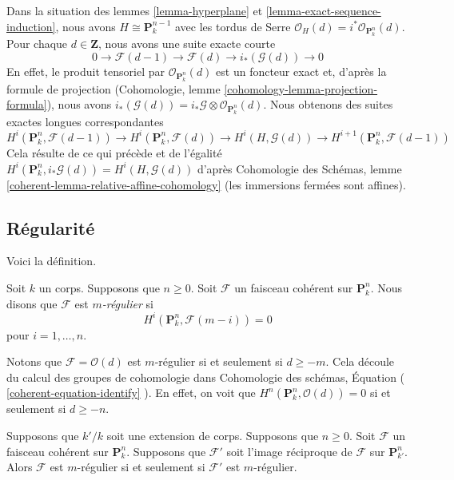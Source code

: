 \begin{remark}
\label{remark-exact-sequence-induction-cohomology}
Dans la situation des lemmes \ref{lemma-hyperplane} et
\ref{lemma-exact-sequence-induction}, nous avons $H \cong
\mathbf{P}^{n - 1}_k$ avec les tordus de Serre
$\mathcal{O}_H(d) = i^*\mathcal{O}_{\mathbf{P}^n_k}(d)$. Pour
chaque $d \in \mathbf{Z}$, nous avons une suite exacte courte
$$
0 \to \mathcal{F}(d - 1) \to \mathcal{F}(d) \to i_*(\mathcal{G}(d)) \to 0
$$
En effet, le produit tensoriel par
$\mathcal{O}_{\mathbf{P}^n_k}(d)$ est un foncteur exact et,
d'après la formule de projection (Cohomologie, lemme
\ref{cohomology-lemma-projection-formula}), nous avons
$i_*(\mathcal{G}(d)) = i_*\mathcal{G} \otimes
\mathcal{O}_{\mathbf{P}^n_k}(d)$. Nous obtenons des suites exactes longues correspondantes
$$
H^i(\mathbf{P}^n_k, \mathcal{F}(d - 1)) \to
H^i(\mathbf{P}^n_k, \mathcal{F}(d)) \to
H^i(H, \mathcal{G}(d)) \to
H^{i + 1}(\mathbf{P}^n_k, \mathcal{F}(d - 1))
$$
Cela résulte de ce qui précède et de l'égalité
$H^i(\mathbf{P}^n_k, i_*\mathcal{G}(d)) = H^i(H,
\mathcal{G}(d))$ d'après Cohomologie des Schémas, lemme
\ref{coherent-lemma-relative-affine-cohomology} (les immersions fermées sont affines).
\end{remark}





\subsection{Régularité}
\label{subsection-regularity}

\noindent
Voici la définition.

\begin{definition}
\label{definition-regularity}
Soit $k$ un corps. Supposons que $n \geq 0$.
Soit $\mathcal{F}$ un faisceau cohérent sur
$\mathbf{P}^n_k$. Nous disons que $\mathcal{F}$ est {\it $m$-régulier} si
$$
H^i(\mathbf{P}^n_k, \mathcal{F}(m - i)) = 0
$$
pour $i = 1, \ldots, n$.
\end{definition}

\noindent
Notons que $\mathcal{F} = \mathcal{O}(d)$ est $m$-régulier si
et seulement si $d \geq -m$. Cela découle du calcul des groupes
de cohomologie dans Cohomologie des schémas, Équation (
\ref{coherent-equation-identify} ). En effet, on voit que
$H^n(\mathbf{P}^n_k, \mathcal{O}(d)) = 0$ si et seulement si $d \geq -n$.

\begin{lemma}
\label{lemma-m-regular-extend-base-field}
Supposons que $k'/k$ soit une extension de corps. Supposons que
$n \geq 0$. Soit $\mathcal{F}$ un faisceau cohérent sur
$\mathbf{P}^n_k$. Supposons que $\mathcal{F}'$ soit l'image réciproque de
$\mathcal{F}$ sur $\mathbf{P}^n_{k'}$. Alors $\mathcal{F}$
est $m$-régulier si et seulement si $\mathcal{F}'$ est $m$-régulier.
\end{lemma}

